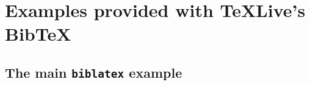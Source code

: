 \documentclass[a4paper,australian,oneside,12pt,footlines=3]{scrbook}%
\newcommand{\biblatex}{\texttt{biblatex}}
\theoremstyle{remark}
\begin{document}
\chapter{Examples provided with TeXLive's Bib\TeX{}}
\section{The main \biblatex{} example}
\begin{refsection}
	\nocite{*}
	\printbibliography[heading=subbibliography]
\end{refsection}
\printbibliography[heading=bibintoc]
\end{document}
